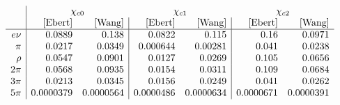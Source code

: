 $$
\begin{array}{r|rr|rr|rr}
  &\multicolumn{2}{c}{\chi_{c0}} & \multicolumn{2}{c}{\chi_{c1}} & \multicolumn{2}{c}{\chi_{c2}} \\
   & \text{[Ebert]} & \text{[Wang]} & \text{[Ebert]} & \text{[Wang]} & \text{[Ebert]} & \text{[Wang]} \\
\hline
 e\nu & 0.0889 & 0.138 & 0.0822 & 0.115 & 0.16 & 0.0971 \\
 \pi & 0.0217 & 0.0349 & 0.000644 & 0.00281 & 0.041 & 0.0238 \\
 \rho & 0.0547 & 0.0901 & 0.0127 & 0.0269 & 0.105 & 0.0656 \\
 2\pi & 0.0568 & 0.0935 & 0.0154 & 0.0311 & 0.109 & 0.0684 \\
 3\pi & 0.0213 & 0.0345 & 0.0156 & 0.0249 & 0.041 & 0.0262 \\
 5\pi & 0.0000379 & 0.0000564 & 0.0000486 & 0.0000634 & 0.0000671 & 0.0000391 \\
\end{array}
$$